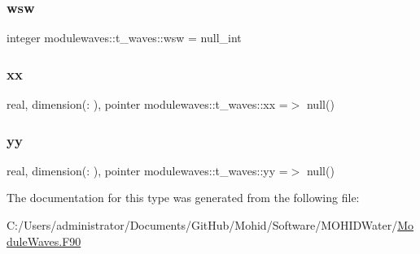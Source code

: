 \mbox{\label{structmodulewaves_1_1t__waves_a7f5515d3f8600e2f407d18c7016c82d6}} 
\subsubsection{\texorpdfstring{wsw}{wsw}}
{\footnotesize\ttfamily integer modulewaves\+::t\+\_\+waves\+::wsw = null\+\_\+int\hspace{0.3cm}{\ttfamily [private]}}

\mbox{\label{structmodulewaves_1_1t__waves_a352b0d937ed63f156fcff6a95292cbee}} 
\subsubsection{\texorpdfstring{xx}{xx}}
{\footnotesize\ttfamily real, dimension(\+:    ), pointer modulewaves\+::t\+\_\+waves\+::xx =$>$ null()\hspace{0.3cm}{\ttfamily [private]}}

\mbox{\label{structmodulewaves_1_1t__waves_a01f6c9042f2bc92d88b0b60b7817bd76}} 
\subsubsection{\texorpdfstring{yy}{yy}}
{\footnotesize\ttfamily real, dimension(\+:    ), pointer modulewaves\+::t\+\_\+waves\+::yy =$>$ null()\hspace{0.3cm}{\ttfamily [private]}}



The documentation for this type was generated from the following file\+:\begin{DoxyCompactItemize}
\item 
C\+:/\+Users/administrator/\+Documents/\+Git\+Hub/\+Mohid/\+Software/\+M\+O\+H\+I\+D\+Water/\mbox{\hyperlink{_module_waves_8_f90}{Module\+Waves.\+F90}}\end{DoxyCompactItemize}
